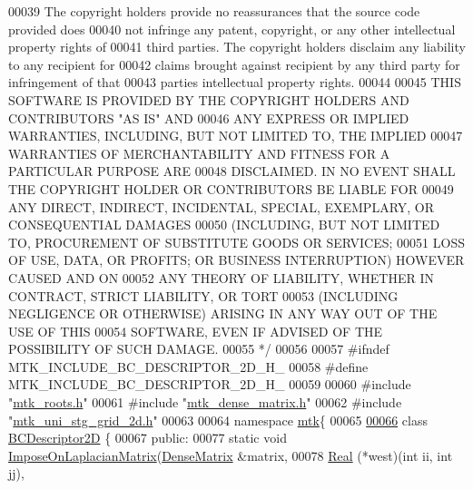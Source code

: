 \begin{DoxyCode}
00039 \textcolor{comment}{The copyright holders provide no reassurances that the source code provided does}
00040 \textcolor{comment}{not infringe any patent, copyright, or any other intellectual property rights of}
00041 \textcolor{comment}{third parties. The copyright holders disclaim any liability to any recipient for}
00042 \textcolor{comment}{claims brought against recipient by any third party for infringement of that}
00043 \textcolor{comment}{parties intellectual property rights.}
00044 \textcolor{comment}{}
00045 \textcolor{comment}{THIS SOFTWARE IS PROVIDED BY THE COPYRIGHT HOLDERS AND CONTRIBUTORS "AS IS" AND}
00046 \textcolor{comment}{ANY EXPRESS OR IMPLIED WARRANTIES, INCLUDING, BUT NOT LIMITED TO, THE IMPLIED}
00047 \textcolor{comment}{WARRANTIES OF MERCHANTABILITY AND FITNESS FOR A PARTICULAR PURPOSE ARE}
00048 \textcolor{comment}{DISCLAIMED. IN NO EVENT SHALL THE COPYRIGHT HOLDER OR CONTRIBUTORS BE LIABLE FOR}
00049 \textcolor{comment}{ANY DIRECT, INDIRECT, INCIDENTAL, SPECIAL, EXEMPLARY, OR CONSEQUENTIAL DAMAGES}
00050 \textcolor{comment}{(INCLUDING, BUT NOT LIMITED TO, PROCUREMENT OF SUBSTITUTE GOODS OR SERVICES;}
00051 \textcolor{comment}{LOSS OF USE, DATA, OR PROFITS; OR BUSINESS INTERRUPTION) HOWEVER CAUSED AND ON}
00052 \textcolor{comment}{ANY THEORY OF LIABILITY, WHETHER IN CONTRACT, STRICT LIABILITY, OR TORT}
00053 \textcolor{comment}{(INCLUDING NEGLIGENCE OR OTHERWISE) ARISING IN ANY WAY OUT OF THE USE OF THIS}
00054 \textcolor{comment}{SOFTWARE, EVEN IF ADVISED OF THE POSSIBILITY OF SUCH DAMAGE.}
00055 \textcolor{comment}{*/}
00056 
00057 \textcolor{preprocessor}{#ifndef MTK\_INCLUDE\_BC\_DESCRIPTOR\_2D\_H\_}
00058 \textcolor{preprocessor}{#define MTK\_INCLUDE\_BC\_DESCRIPTOR\_2D\_H\_}
00059 
00060 \textcolor{preprocessor}{#include "\hyperlink{mtk__roots_8h}{mtk\_roots.h}"}
00061 \textcolor{preprocessor}{#include "\hyperlink{mtk__dense__matrix_8h}{mtk\_dense\_matrix.h}"}
00062 \textcolor{preprocessor}{#include "\hyperlink{mtk__uni__stg__grid__2d_8h}{mtk\_uni\_stg\_grid\_2d.h}"}
00063 
00064 \textcolor{keyword}{namespace }\hyperlink{namespacemtk}{mtk}\{
00065 
\hypertarget{mtk__bc__descriptor__2d_8h_source_l00066}{}\hyperlink{classmtk_1_1BCDescriptor2D}{00066} \textcolor{keyword}{class }\hyperlink{classmtk_1_1BCDescriptor2D}{BCDescriptor2D} \{
00067  \textcolor{keyword}{public}:
00077   \textcolor{keyword}{static} \textcolor{keywordtype}{void} \hyperlink{classmtk_1_1BCDescriptor2D_a55617743d19ee506f768089716a1c381}{ImposeOnLaplacianMatrix}(\hyperlink{classmtk_1_1DenseMatrix}{DenseMatrix} &matrix,
00078                                       \hyperlink{group__c01-roots_gac080bbbf5cbb5502c9f00405f894857d}{Real} (*west)(\textcolor{keywordtype}{int} ii, \textcolor{keywordtype}{int} jj),

\end{DoxyCode}
